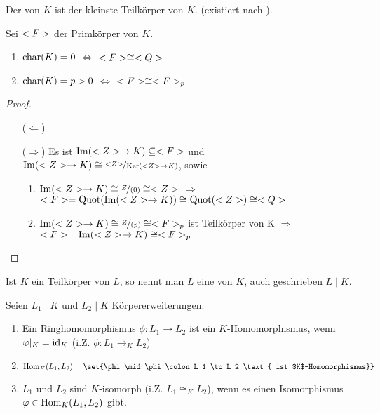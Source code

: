 \begin{definition}[Primkörper]
	Der  von $K$ ist der kleinste Teilkörper von $K$. (existiert nach ).
\end{definition}

\begin{proposition}
	Sei $<F>$ der Primkörper von $K$.
	\begin{enumerate}[label=(\alph*)]
		\item $\operatorname{char}(K)  = 0$ $\Leftrightarrow$ $<F> \cong <Q>$
		\item $\operatorname{char}(K)  = p > 0$ $\Leftrightarrow$ $<F> \cong <F>_p$
	\end{enumerate}
\end{proposition}

\begin{proof}\hspace{0pt}
	\vspace*{\dimexpr-\baselineskip+2\lineskip\relax}
	\begin{itemize}
	\item[($\Leftarrow$)]  %
	\item[($\Rightarrow$)] Es ist $\operatorname{Im}(<Z> \to K) \subseteq <F>$ und $\Image(\Z \to K) \cong \lnkset{\Z}{\Ker(\Z \to K)}$, sowie
		\begin{enumerate}[label=(\alph*)]
			\item $\Image(\Z \to K) \cong \lnkset{Z}{(0)} \cong \Z$ $\Rightarrow$ $<F> = \operatorname{Quot}(\operatorname{Im}(<Z> \to K)) \cong \operatorname{Quot}(<Z>) \cong <Q>$
			\item $\Image(\Z \to K) \cong \lnkset{Z}{(p)} \cong \Fp$ ist Teilkörper von K $\Rightarrow$ $<F> = \operatorname{Im}(<Z> \to K) \cong <F>_p$
		\end{enumerate}
	\end{itemize}
\end{proof}

\begin{definition}[Körpererweiterung]
	Ist $K$ ein Teilkörper von $L$, so nennt man $L$ eine  von $K$, auch geschrieben $L \mid K$.
\end{definition}

\begin{definition}[$K$-Homomorphismus]
	Seien $L_1 \mid K$ und $L_2 \mid K$ Körpererweiterungen.
	\begin{enumerate}[label=(\alph*)]
		\item Ein Ringhomomorphismus $\phi\colon L_1 \to L_2$ ist ein $K$-Homomorphismus, wenn $\varphi\vert_K = \operatorname{id}_K$ (i.Z. $\phi\colon L_1 \to_K L_2$)
		\item $\Hom_K(L_1,L_2) = \set{\phi \mid \phi\colon L_1 \to L_2 \text{ ist $K$-Homomorphismus}}$
		\item $L_1$ und $L_2$ sind $K$-isomorph (i.Z. $L_1 \cong_K L_2$), wenn es einen Isomorphismus $\varphi \in \operatorname{Hom}_K(L_1, L_2)$ gibt.
	\end{enumerate}
\end{definition}

